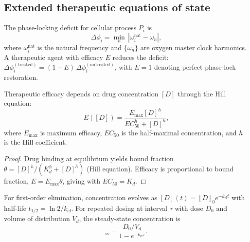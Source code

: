 \subsection{Extended therapeutic equations of state}

\begin{definition}
\label{def:ch07-phase-locking-deficit}
The phase-locking deficit for cellular process $P_i$ is
\begin{equation}
  \Delta\phi_i = \min_{n}\,|\omega_i^{\mathrm{nat}} - \omega_n|,
  \label{eq:ch07-phase-locking-deficit}
\end{equation}
where $\omega_i^{\mathrm{nat}}$ is the natural frequency and $\{\omega_n\}$
are oxygen master clock harmonics.  A therapeutic agent with efficacy $E$
reduces the deficit: $\Delta\phi_i^{(\mathrm{treated})} = (1-E)\,\Delta\phi_i^{(\mathrm{untreated})}$,
with $E = 1$ denoting perfect phase-lock restoration.
\end{definition}

\begin{theorem}
\label{thm:ch07-dose-response}
Therapeutic efficacy depends on drug concentration $[D]$ through the Hill
equation:
\begin{equation}
  E([D]) = \frac{E_{\max}[D]^h}{EC_{50}^h + [D]^h},
  \label{eq:ch07-dose-response}
\end{equation}
where $E_{\max}$ is maximum efficacy, $EC_{50}$ is the half-maximal
concentration, and $h$ is the Hill coefficient.
\end{theorem}

\begin{proof}
Drug binding at equilibrium yields bound fraction
$\theta = [D]^h / (K_d^h + [D]^h)$ (Hill equation).  Efficacy is
proportional to bound fraction, $E = E_{\max}\theta$, giving
 with $EC_{50} = K_d$.
\end{proof}

\begin{theorem}
\label{thm:ch07-pk}
For first-order elimination, concentration evolves as
$[D](t) = [D]_0 e^{-k_{\mathrm{el}} t}$ with half-life
$t_{1/2} = \ln 2/k_{\mathrm{el}}$.  For repeated dosing at interval $\tau$
with dose $D_0$ and volume of distribution $V_d$, the steady-state
concentration is
\begin{equation}
  [D]_{\mathrm{ss}}
  = \frac{D_0/V_d}{1 - e^{-k_{\mathrm{el}}\tau}}.
  \label{eq:ch07-steady-state}
\end{equation}
\end{theorem}

